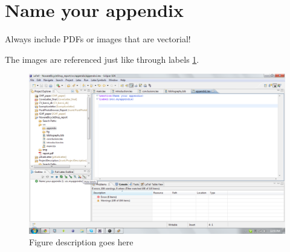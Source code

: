 \section{Name your appendix}
\label{sec.myappendix}
Always include PDFs or images that are vectorial!

The images are referenced just like through labels \ref{fig.screenshot}.

\begin{figure}[H]
    \begin{center}
        \includegraphics[width=\textwidth]{fig/screenshot.pdf}
        \caption{Figure description goes here}
        \label{fig.screenshot}
    \end{center}
\end{figure}